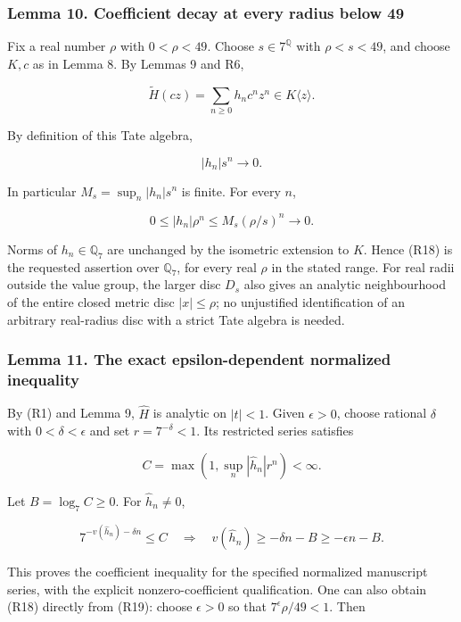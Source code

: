 \documentclass[11pt,a4paper]{article}
\begin{document}
\hypertarget{lemma-10.-coefficient-decay-at-every-radius-below-49}{%
\subsubsection{Lemma 10. Coefficient decay at every radius below 49}\label{lemma-10.-coefficient-decay-at-every-radius-below-49}}

Fix a real number \(\rho\) with \(0<\rho<49\). Choose \(s\in7^{\mathbb Q}\) with \(\rho<s<49\), and choose \(K,c\) as in Lemma 8. By Lemmas 9 and R6,

\[
\widetilde H(cz)=\sum_{n\ge0}h_nc^nz^n\in K\langle z\rangle.
\]

By definition of this Tate algebra,

\[
|h_n|s^n\longrightarrow0.
\]

In particular \(M_s=\sup_n|h_n|s^n\) is finite. For every \(n\),

\[
0\le |h_n|\rho^n\le M_s(\rho/s)^n\longrightarrow0.
\tag{R18}
\]

Norms of \(h_n\in\mathbb Q_7\) are unchanged by the isometric extension to \(K\). Hence (R18) is the requested assertion over \(\mathbb Q_7\), for every real \(\rho\) in the stated range. For real radii outside the value group, the larger disc \(D_s\) also gives an analytic neighbourhood of the entire closed metric disc \(|x|\le\rho\); no unjustified identification of an arbitrary real-radius disc with a strict Tate algebra is needed.

\hypertarget{lemma-11.-the-exact-epsilon-dependent-normalized-inequality}{%
\subsubsection{Lemma 11. The exact epsilon-dependent normalized inequality}\label{lemma-11.-the-exact-epsilon-dependent-normalized-inequality}}

By (R1) and Lemma 9, \(\widehat H\) is analytic on \(|t|<1\). Given \(\epsilon>0\), choose rational \(\delta\) with \(0<\delta<\epsilon\) and set \(r=7^{-\delta}<1\). Its restricted series satisfies

\[
C=\max\left(1,\sup_n |\widehat h_n|r^n\right)<\infty.
\]

Let \(B=\log_7C\ge0\). For \(\widehat h_n\ne0\),

\[
7^{-v(\widehat h_n)-\delta n}\le C
\quad\Longrightarrow\quad
v(\widehat h_n)\ge-\delta n-B\ge-\epsilon n-B.
\tag{R19}
\]

This proves the coefficient inequality for the specified normalized manuscript series, with the explicit nonzero-coefficient qualification. One can also obtain (R18) directly from (R19): choose \(\epsilon>0\) so that \(7^\epsilon\rho/49<1\). Then
\end{document}
